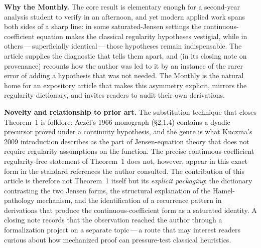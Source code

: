 \documentclass[12pt]{article}
\begin{document}
\bigskip
\noindent\textbf{Why the Monthly.}
The core result is elementary enough for a second-year analysis student
to verify in an afternoon, and yet modern applied work spans both
sides of a sharp line: in some saturated-Jensen settings the
continuous-coefficient equation makes the classical regularity
hypotheses vestigial, while in others\,---\,superficially
identical\,---\,those hypotheses remain indispensable. The article
supplies the diagnostic that tells them apart, and (in its closing
note on provenance) recounts how the author was led to it by an
instance of the rarer error of adding a hypothesis that was not
needed. The Monthly is the natural home for an expository article that
makes this asymmetry explicit, mirrors the regularity dictionary, and
invites readers to audit their own derivations.

\bigskip
\noindent\textbf{Novelty and relationship to prior art.}
The substitution technique that closes Theorem~1 is folklore:
Acz\'{e}l's 1966 monograph (\S2.1.4) contains a dyadic precursor proved
under a continuity hypothesis, and the genre is what Kuczma's 2009
introduction describes as the part of Jensen-equation theory that does
not require regularity assumptions on the function. The precise
continuous-coefficient regularity-free statement of Theorem~1 does
not, however, appear in this exact form in the standard references the
author consulted. The contribution of this article is therefore not
Theorem~1 itself but its \emph{explicit packaging}: the dictionary
contrasting the two Jensen forms, the structural explanation of the
Hamel-pathology mechanism, and the identification of a recurrence
pattern in derivations that produce the continuous-coefficient form as
a saturated identity. A closing note records that the observation
reached the author through a formalization project on a separate
topic\,---\,a route that may interest readers curious about how
mechanized proof can pressure-test classical heuristics.
\end{document}

